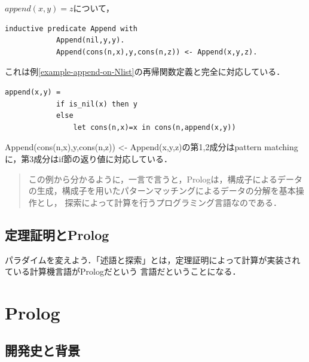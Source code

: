 \documentclass[uplatex, dvipdfmx]{jsreport}
\begin{document}
\begin{example}[Append]$append(x,y)=z$について，
    \begin{lstlisting}[caption=Append]
        inductive predicate Append with
            Append(nil,y,y).
            Append(cons(n,x),y,cons(n,z)) <- Append(x,y,z).
    \end{lstlisting}
\end{example}
\begin{remark}
    これは例\ref{example-append-on-Nlist}の再帰関数定義と完全に対応している．
    \begin{lstlisting}[caption=append]
        append(x,y) =
            if is_nil(x) then y
            else
                let cons(n,x)=x in cons(n,append(x,y))
    \end{lstlisting}
    Append(cons(n,x),y,cons(n,z)) <- Append(x,y,z)の第1,2成分はpattern matchingに，第3成分はif節の返り値に対応している．
\end{remark}
\begin{quote}
    この例から分かるように，一言で言うと，Prologは，構成子によるデータの生成，構成子を用いたパターンマッチングによるデータの分解を基本操作とし，
    探索によって計算を行うプログラミング言語なのである\cite{関数プログラミング}．
\end{quote}

\subsection{定理証明とProlog}

パラダイムを変えよう．「述語と探索」とは，定理証明によって計算が実装されている計算機言語がPrologだという
言語だということになる．

\section{Prolog}

\subsection{開発史と背景}
\end{document}

